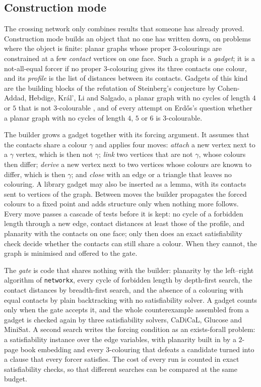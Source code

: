 \subsection{Construction mode}\label{ssec:construct}

The crossing network only combines results that someone has already proved. Construction mode builds an object that no one has written down, on problems where the object is finite: planar graphs whose proper $3$-colourings are constrained at a few \emph{contact} vertices on one face. Such a graph is a \emph{gadget}; it is a not-all-equal forcer if no proper $3$-colouring gives its three contacts one colour, and its \emph{profile} is the list of distances between its contacts. Gadgets of this kind are the building blocks of the refutation of Steinberg's conjecture by Cohen-Addad, Hebdige, Kr\'al', Li and Salgado, a planar graph with no cycles of length $4$ or $5$ that is not $3$-colourable \cite{CHK17}, and of every attempt on Erd\H{o}s's question whether a planar graph with no cycles of length $4$, $5$ or $6$ is $3$-colourable.

The builder grows a gadget together with its forcing argument. It assumes that the contacts share a colour $\gamma$ and applies four moves: \emph{attach} a new vertex next to a $\gamma$ vertex, which is then not $\gamma$; \emph{link} two vertices that are not $\gamma$, whose colours then differ; \emph{derive} a new vertex next to two vertices whose colours are known to differ, which is then $\gamma$; and \emph{close} with an edge or a triangle that leaves no colouring. A library gadget may also be inserted as a lemma, with its contacts sent to vertices of the graph. Between moves the builder propagates the forced colours to a fixed point and adds structure only when nothing more follows. Every move passes a cascade of tests before it is kept: no cycle of a forbidden length through a new edge, contact distances at least those of the profile, and planarity with the contacts on one face; only then does an exact satisfiability check decide whether the contacts can still share a colour. When they cannot, the graph is minimised and offered to the gate.

The \emph{gate} is code that shares nothing with the builder: planarity by the left--right algorithm of \texttt{networkx}, every cycle of forbidden length by depth-first search, the contact distances by breadth-first search, and the absence of a colouring with equal contacts by plain backtracking with no satisfiability solver. A gadget counts only when the gate accepts it, and the whole counterexample assembled from a gadget is checked again by three satisfiability solvers, CaDiCaL, Glucose and MiniSat. A second search writes the forcing condition as an exists-forall problem: a satisfiability instance over the edge variables, with planarity built in by a $2$-page book embedding and every $3$-colouring that defeats a candidate turned into a clause that every forcer satisfies. The cost of every run is counted in exact satisfiability checks, so that different searches can be compared at the same budget.

